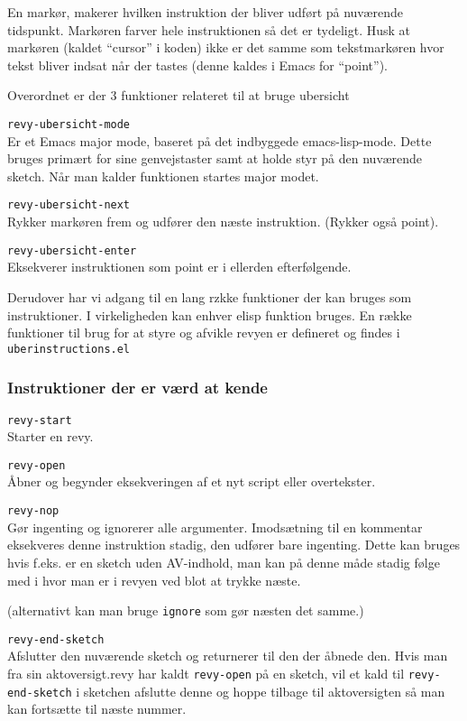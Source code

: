 \documentclass[10pt,a4paper,danish]{article}
\newcommand{\code}[1]{\colorbox{verbgray}{\texttt{#1}}}
\begin{document}
En markør, makerer hvilken instruktion der bliver udført på nuværende tidspunkt.
Markøren farver hele instruktionen så det er tydeligt. Husk at markøren (kaldet
``cursor'' i koden) ikke er det samme som tekstmarkøren hvor tekst bliver indsat
når der tastes (denne kaldes i Emacs for ``point'').

Overordnet er der 3 funktioner relateret til at bruge ubersicht

\code{revy-ubersicht-mode}\\
Er et Emacs major mode, baseret på det indbyggede
emacs-lisp-mode. Dette bruges primært for sine genvejstaster samt at holde styr
på den nuværende sketch. Når man kalder funktionen startes major modet.

\code{revy-ubersicht-next}\\
Rykker markøren frem og udfører den næste instruktion. (Rykker også point).

\code{revy-ubersicht-enter}\\
Eksekverer instruktionen som point er i ellerden efterfølgende.

Derudover har vi adgang til en lang rzkke funktioner der kan bruges som
instruktioner. I virkeligheden kan enhver elisp funktion bruges. En række
funktioner til brug for at styre og afvikle revyen er defineret og findes i
\code{uberinstructions.el}

\subsubsection{Instruktioner der er værd at kende}

\code{revy-start}\\
Starter en revy.

\code{revy-open}\\
Åbner og begynder eksekveringen af et nyt script eller overtekster.

\code{revy-nop}\\
Gør ingenting og ignorerer alle argumenter. Imodsætning til en kommentar
eksekveres denne instruktion stadig, den udfører bare ingenting. Dette kan
bruges hvis f.eks. er en sketch uden AV-indhold, man kan på denne måde stadig
følge med i hvor man er i revyen ved blot at trykke næste.

(alternativt kan man bruge \code{ignore} som gør næsten det samme.)

\code{revy-end-sketch}\\
Afslutter den nuværende sketch og returnerer til den der åbnede den. Hvis man
fra sin aktoversigt.revy har kaldt \code{revy-open} på en sketch, vil et kald
til \code{revy-end-sketch} i sketchen afslutte denne og hoppe tilbage til
aktoversigten så man kan fortsætte til næste nummer.
\end{document}
